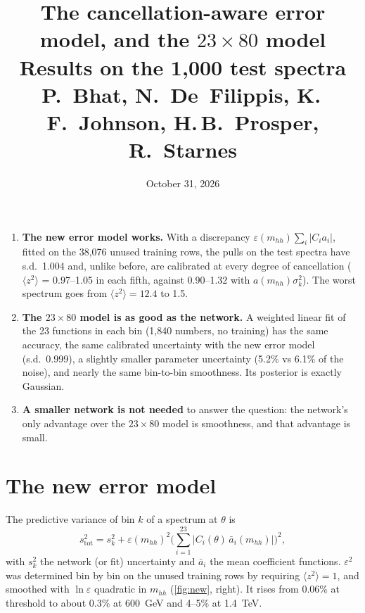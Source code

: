 
\title{\textbf{The cancellation-aware error model, and the $23\times80$ model}\\[4pt]
\large Results on the 1,000 test spectra\\[4pt]
\normalsize P.~Bhat, N.~De~Filippis, K.\,F.~Johnson, H.\,B.~Prosper, R.~Starnes}
\date{October 31, 2026}

\maketitle

\begin{keyidea}[In brief]
\begin{enumerate}
  \item \textbf{The new error model works.} With a discrepancy
    $\varepsilon(m_{hh})\sum_i|C_ia_i|$, fitted on the 38,076 unused training rows, the pulls
    on the test spectra have s.d.\ 1.004 and, unlike before, are calibrated at every degree
    of cancellation ($\langle z^2\rangle$ = 0.97--1.05 in each fifth, against 0.90--1.32 with
    $a(m_{hh})\sigma_k^2$). The worst spectrum goes from $\langle z^2\rangle = 12.4$ to 1.5.
  \item \textbf{The $23\times80$ model is as good as the network.} A weighted linear fit of
    the 23 functions in each bin (1,840 numbers, no training) has the same accuracy, the
    same calibrated uncertainty with the new error model (s.d.\ 0.999), a slightly smaller
    parameter uncertainty (5.2\% vs 6.1\% of the noise), and nearly the same bin-to-bin
    smoothness. Its posterior is exactly Gaussian.
  \item \textbf{A smaller network is not needed} to answer the question: the network's only
    advantage over the $23\times80$ model is smoothness, and that advantage is small.
\end{enumerate}
\end{keyidea}

\section{The new error model}

The predictive variance of bin $k$ of a spectrum at $\theta$ is
\begin{equation}
  s_\text{tot}^2 = s_k^2 + \varepsilon(m_{hh})^2\Big(\sum_{i=1}^{23}|C_i(\theta)\,\bar a_i(m_{hh})|\Big)^2 ,
\end{equation}
with $s_k^2$ the network (or fit) uncertainty and $\bar a_i$ the mean coefficient functions.
$\varepsilon^2$ was determined bin by bin on the unused training rows by requiring
$\langle z^2\rangle = 1$, and smoothed with $\ln\varepsilon$ quadratic in $m_{hh}$
(\cref{fig:new}, right). It rises from 0.06\% at threshold to about 0.3\% at 600~GeV and
4--5\% at 1.4~TeV.

